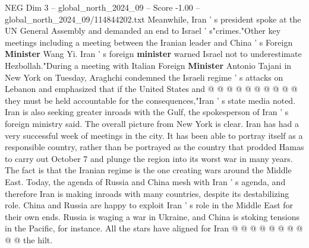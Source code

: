 \begin{textsample}{NEG Dim 3 – global\_north\_2024\_09 – Score -1.00 – global\_north\_2024\_09/114844202.txt}
Meanwhile, Iran ' s president spoke at the UN General Assembly and demanded an end to Israel ' s"crimes."Other key meetings including a meeting between the Iranian leader and China ' s Foreign \textbf{Minister} Wang Yi.
Iran ' s foreign \textbf{minister} warned Israel not to underestimate Hezbollah."During a meeting with Italian Foreign \textbf{Minister} Antonio Tajani in New York on Tuesday, Araghchi condemned the Israeli regime ' s attacks on Lebanon and emphasized that if the United States and @ @ @ @ @ @ @ @ @ @ they must be held accountable for the consequences,"Iran ' s state media noted.
Iran is also seeking greater inroads with the Gulf, the spokesperson of Iran ' s foreign ministry said.
The overall picture from New York is clear.
Iran has had a very successful week of meetings in the city.
It has been able to portray itself as a responsible country, rather than be portrayed as the country that prodded Hamas to carry out October 7 and plunge the region into its worst war in many years.
The fact is that the Iranian regime is the one creating wars around the Middle East.
Today, the agenda of Russia and China mesh with Iran ' s agenda, and therefore Iran is making inroads with many countries, despite its destabilizing role.
China and Russia are happy to exploit Iran ' s role in the Middle East for their own ends.
Russia is waging a war in Ukraine, and China is stoking tensions in the Pacific, for instance.
All the stars have aligned for Iran @ @ @ @ @ @ @ @ @ @ the hilt.

\end{textsample}
